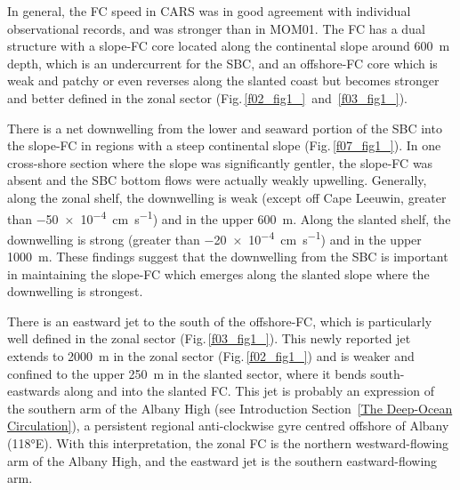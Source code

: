 \documentclass[preprint,3p,review,12pt]{elsarticle}
\begin{document}
In general, the FC speed in CARS was in good agreement with individual observational records, and was stronger than in MOM01.
The FC has a dual structure with a slope-FC core located along the continental slope around \SI{600}{\meter} depth, which is an undercurrent for the SBC, and an offshore-FC core 
which is weak and patchy or even reverses along the slanted coast but becomes stronger and better defined in the zonal sector (Fig.\,\ref{f02_fig1_}~and~\ref{f03_fig1_}).

There is a net downwelling
from the lower and seaward portion of the SBC into the slope-FC
in regions with a steep continental slope (Fig.\,\ref{f07_fig1_}).
In one cross-shore section where the slope was significantly gentler, the slope-FC was absent and the SBC bottom flows were actually weakly upwelling. Generally, along the zonal shelf, the downwelling is weak (except off Cape Leeuwin, greater than \SI{-50 e-4}{\centi\meter\per\second}) and in the upper \SI{600}{\meter}. Along the slanted shelf, the downwelling is strong (greater than \SI{-20 e-4}{\centi\meter\per\second}) and in the upper \SI{1000}{\meter}. These findings suggest that the downwelling from the SBC is important in maintaining the slope-FC which emerges along the slanted slope where the downwelling is strongest.

There is an eastward jet to the south of the offshore-FC, which is particularly well defined in the zonal sector (Fig.\,\ref{f03_fig1_}).
This newly reported jet extends
to \SI{2000}{\meter} in the zonal sector (Fig.\,\ref{f02_fig1_}) and is weaker and confined to the upper \SI{250}{\meter} in the slanted sector,
where it bends south-eastwards along and into the slanted FC\@.
This jet is probably an expression of the southern arm
of the Albany High (see Introduction Section~\ref{The Deep-Ocean Circulation}),
a persistent regional anti-clockwise gyre centred offshore of Albany (\ang{118}E). With this interpretation,  the zonal FC is the northern westward-flowing arm of the Albany High, and the eastward jet is the southern eastward-flowing arm.
\end{document}
